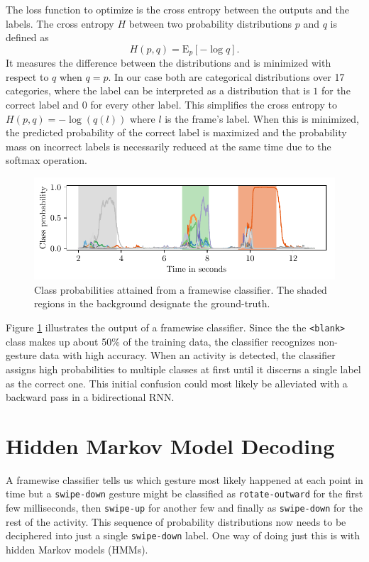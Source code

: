 The loss function to optimize is the cross entropy between the outputs and the
labels. The cross entropy $H$ between two probability distributions $p$ and $q$
is defined as
\begin{equation*}
  H(p, q) = \mathrm{E}_{p} \left[ -\log q \right].
\end{equation*}
It measures the difference between the distributions and is minimized with
respect to $q$ when $q = p$. In our case both are categorical distributions over
17 categories, where the label can be interpreted as a distribution that is $1$
for the correct label and $0$ for every other label. This simplifies the cross
entropy to $H(p, q) = -\log(q(l))$ where $l$ is the frame's label. When this is
minimized, the predicted probability of the correct label is maximized and the
probability mass on incorrect labels is necessarily reduced at the same time due
to the softmax operation.

\begin{figure}[h]
  \centering
  \includegraphics{figures/methods/framewise}
  \caption{Class probabilities attained from a framewise classifier. The shaded
    regions in the background designate the ground-truth.}
  \label{fig:framewise-p}
\end{figure}

Figure \ref{fig:framewise-p} illustrates the output of a framewise classifier.
Since the the \texttt{<blank>} class makes up about 50\% of the training data,
the classifier recognizes non-gesture data with high accuracy. When an activity
is detected, the classifier assigns high probabilities to multiple classes at
first until it discerns a single label as the correct one. This initial
confusion could most likely be alleviated with a backward pass in a
bidirectional RNN.

\section{Hidden Markov Model Decoding}
\label{sec:hmm}

A framewise classifier tells us which gesture most likely happened at each point
in time but a \texttt{swipe-down} gesture might be classified as
\texttt{rotate-outward} for the first few milliseconds, then \texttt{swipe-up}
for another few and finally as \texttt{swipe-down} for the rest of the activity.
This sequence of probability distributions now needs to be deciphered into just
a single \texttt{swipe-down} label. One way of doing just this is with hidden
Markov models (HMMs).

